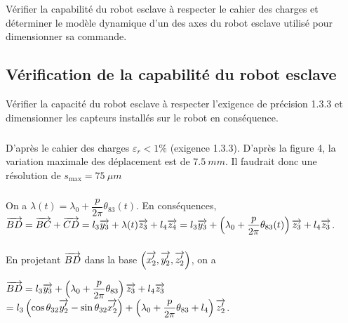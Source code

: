 \documentclass[10pt,fleqn]{article} %
\begin{document}
\begin{obj}
Vérifier la capabilité du robot esclave à respecter le cahier des charges et déterminer le modèle dynamique
d’un des axes du robot esclave utilisé pour dimensionner sa commande.
\end{obj}

\subsection{Vérification de la capabilité du robot esclave}
\begin{obj}
Vérifier la capacité du robot esclave à respecter l’exigence de précision 1.3.3 et dimensionner les
capteurs installés sur le robot en conséquence.
\end{obj}


\subparagraph{}%

D'après le cahier des charges $\varepsilon_r<1\%$ (exigence 1.3.3). 
D'après la figure 4, la variation maximale des déplacement est de $\SI{7,5}{mm}$. Il faudrait donc une résolution de $s_{\text{max}}=\SI{75}{\mu m}$



\subparagraph{}%
On a $\lambda(t)=\lambda_0 + \dfrac{p}{2\pi} \theta_{83}(t)$. 
En conséquences, $\overrightarrow{BD}=\overrightarrow{BC}+\overrightarrow{CD}=l_3\overrightarrow{y_3}+\lambda(t)\overrightarrow{z_3}+l_4\overrightarrow{z_4}
=l_3\overrightarrow{y_3}+\left( \lambda_0 + \dfrac{p}{2\pi} \theta_{83}(t) \right)\overrightarrow{z_3}+l_4\overrightarrow{z_3}$.


\subparagraph{}%



En projetant $\overrightarrow{BD}$ dans la base $\left(\overrightarrow{x_2'},\overrightarrow{y_2'},\overrightarrow{z_2'} \right)$, on a 

 $\overrightarrow{BD}=l_3\overrightarrow{y_3}+\left( \lambda_0 + \dfrac{p}{2\pi} \theta_{83} \right)\overrightarrow{z_3}+l_4\overrightarrow{z_3}$
 $ =l_3\left( \cos \theta_{32} \overrightarrow{y_2'} - \sin\theta_{32} \overrightarrow{x_2'}  \right)+\left( \lambda_0 + \dfrac{p}{2\pi} \theta_{83} +l_4\right)\overrightarrow{z_2'}$.
 
\end{document}
